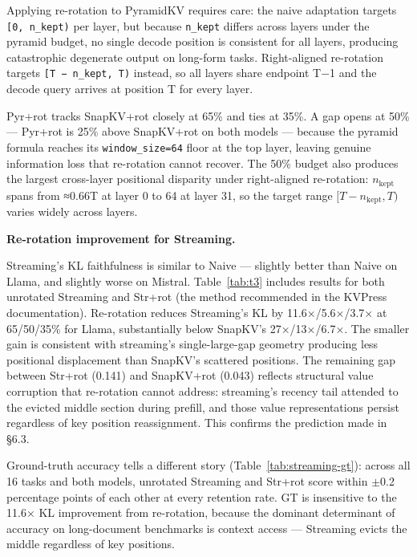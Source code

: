 \documentclass[10pt,letterpaper]{article}
\begin{document}
Applying re-rotation to PyramidKV requires care: the naive adaptation
targets \texttt{[0,\ n\_kept)} per layer, but because \texttt{n\_kept}
differs across layers under the pyramid budget, no single decode
position is consistent for all layers, producing catastrophic degenerate
output on long-form tasks. Right-aligned re-rotation targets
\texttt{[T\ −\ n\_kept,\ T)} instead, so all layers share endpoint T−1
and the decode query arrives at position T for every layer.

Pyr+rot tracks SnapKV+rot closely at 65\% and ties at 35\%. A gap opens
at 50\% --- Pyr+rot is 25\% above SnapKV+rot on both models --- because
the pyramid formula reaches its \texttt{window\_size=64} floor at the
top layer, leaving genuine information loss that re-rotation cannot
recover. The 50\% budget also produces the largest cross-layer
positional disparity under right-aligned re-rotation:
\(n_{\text{kept}}\) spans from ≈0.66T at layer 0 to 64 at layer 31, so
the target range \([T - n_{\text{kept}}, T)\) varies widely across
layers.

\textbf{Re-rotation improvement for Streaming.}

Streaming's KL faithfulness is similar to Naive --- slightly better than Naive on Llama,
and slightly worse on Mistral. Table~\ref{tab:t3} includes results for both unrotated
Streaming and Str+rot (the method recommended in the KVPress documentation).
Re-rotation reduces Streaming's KL by 11.6×/5.6×/3.7× at 65/50/35\% for Llama,
substantially below SnapKV's 27×/13×/6.7×. The smaller gain is consistent with
streaming's single-large-gap geometry producing less positional displacement than
SnapKV's scattered positions. The remaining gap between Str+rot (0.141) and SnapKV+rot
(0.043) reflects structural value corruption that re-rotation cannot address:
streaming's recency tail attended to the evicted middle section during prefill, and
those value representations persist regardless of key position reassignment.
This confirms the prediction made in §6.3.

Ground-truth accuracy tells a different story (Table~\ref{tab:streaming-gt}): across all
16 tasks and both models, unrotated Streaming and Str+rot score within $\pm$0.2 percentage
points of each other at every retention rate. GT is insensitive to the 11.6× KL
improvement from re-rotation, because the dominant determinant of accuracy on
long-document benchmarks is context access --- Streaming evicts the middle regardless
of key positions.
\end{document}

